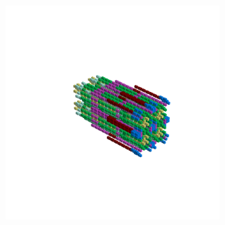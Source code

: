 \begin{minipage}[b]{0.50\linewidth}
\begin{figure}[H]
        \vspace*{-8cm}
        \hspace*{2cm}
        \includegraphics[width=8cm]{src/symmetries/pattern6_4-45.png}
        \vspace*{-2.5cm}
  \caption*{}
  \end{figure}
\end{minipage}
\hspace{1cm}
